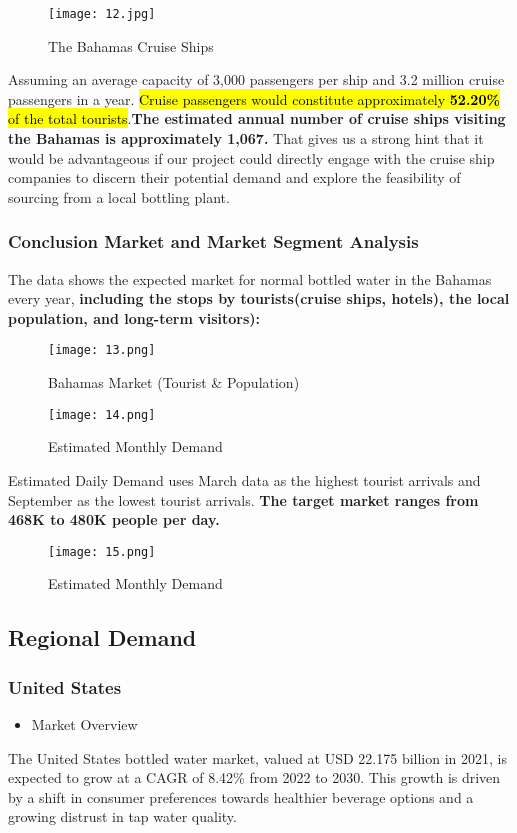 \documentclass{article}
\begin{document}
\begin{figure}[H]
\centering
\texttt{[image: 12.jpg]}
\caption{The Bahamas Cruise Ships}
\label{fig:unique_label_11}
\end{figure}
Assuming an average capacity of 3,000 passengers per ship and 3.2 million cruise passengers in a year. \hl{Cruise passengers would constitute approximately \textbf{52.20\% }of the total tourists}.\textbf{The estimated annual number of cruise ships visiting the Bahamas is approximately 1,067.} That gives us a strong hint that it would be advantageous if our project could directly engage with the cruise ship companies to discern their potential demand and explore the feasibility of sourcing from a local bottling plant.

\subsubsection{Conclusion Market and Market Segment Analysis }
The data shows the expected market for normal bottled water in the Bahamas every year, \textbf{including the stops by tourists(cruise ships, hotels), the local population, and long-term visitors):} 

\begin{figure}[H]
\centering
\texttt{[image: 13.png]}
\caption{Bahamas Market (Tourist \& Population) }
\label{fig:unique_label_11}
\end{figure}

\begin{figure}[H]
\centering
\texttt{[image: 14.png]}
\caption{Estimated Monthly Demand}
\label{fig:unique_label_11}
\end{figure}

Estimated Daily Demand uses March data as the highest tourist arrivals and September as the lowest tourist arrivals. \textbf{The target market ranges from 468K to 480K people per day. }

\begin{figure}[H]
\centering
\texttt{[image: 15.png]}
\caption{Estimated Monthly Demand}
\label{fig:unique_label_15}
\end{figure}

\subsection{Regional Demand}
\subsubsection{United States}
\begin{itemize}
    \item Market Overview
\end{itemize}
The United States bottled water market, valued at USD 22.175 billion in 2021, is expected to grow at a CAGR of 8.42\% from 2022 to 2030. This growth is driven by a shift in consumer preferences towards healthier beverage options and a growing distrust in tap water quality.\par
\end{document}

